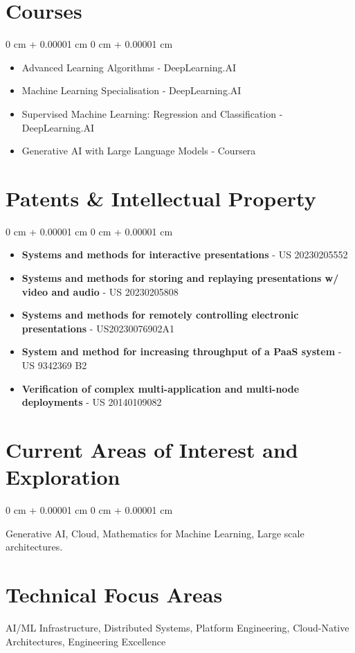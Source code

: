 \documentclass[10pt, letterpaper]{article}
\newenvironment{highlights}{
    \begin{itemize}[
        topsep=0.10 cm,
        parsep=0.10 cm,
        partopsep=0pt,
        itemsep=0pt,
        leftmargin=0 cm + 10pt
    ]
}{
    \end{itemize}
} %
\newenvironment{onecolentry}{
    \begin{adjustwidth}{
        0 cm + 0.00001 cm
    }{
        0 cm + 0.00001 cm
    }
}{
    \end{adjustwidth}
} %
\begin{document}
        \section{Courses}
        \vspace{0.10 cm}
        \begin{onecolentry}
            \begin{highlights}
                \item Advanced Learning Algorithms - DeepLearning.AI
                \item Machine Learning Specialisation - DeepLearning.AI
                \item Supervised Machine Learning: Regression and Classification - DeepLearning.AI
                \item Generative AI with Large Language Models - Coursera
            \end{highlights}
        \end{onecolentry}

        \section{Patents \& Intellectual Property}
        \vspace{0.10 cm}
        \begin{onecolentry}
            \begin{highlights}
                \item \textbf{Systems and methods for interactive presentations} - US 20230205552
                \item \textbf{Systems and methods for storing and replaying presentations w/ video and audio} - US 20230205808
                \item \textbf{Systems and methods for remotely controlling electronic presentations} - US20230076902A1
                \item \textbf{System and method for increasing throughput of a PaaS system} - US 9342369 B2
                \item \textbf{Verification of complex multi-application and multi-node deployments} - US 20140109082
            \end{highlights}
        \end{onecolentry}
        
        \section{Current Areas of Interest and Exploration}
        \vspace{0.10 cm}
        \begin{onecolentry}
            Generative AI, Cloud, Mathematics for Machine Learning, Large scale architectures.
        \end{onecolentry}
        
        \section{Technical Focus Areas}
        AI/ML Infrastructure, Distributed Systems, Platform Engineering, Cloud-Native Architectures, Engineering Excellence

        \vspace{0.10 cm}
\end{document}
